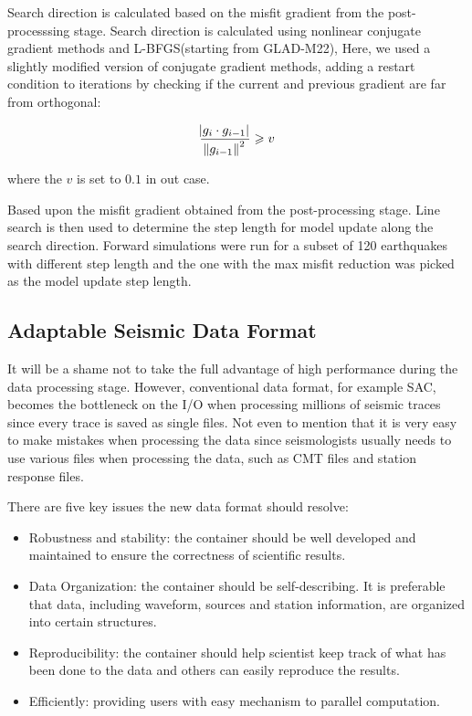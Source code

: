 \documentclass[extra,mreferee]{gji}
\begin{document}
Search direction is calculated based on the misfit gradient from the
post-processsing stage. Search direction is calculated using nonlinear conjugate
gradient methods\citep{tape2007finite} and L-BFGS(starting from GLAD-M22),
Here, we used a slightly modified version of conjugate gradient methods,
adding a restart condition\citep{wright1999numerical} to iterations by checking
if the current and previous gradient are far from orthogonal:

\begin{equation}
  \frac { \abs{g_i \cdot g_{i-1}} }  {\norm{g_{i-1}}^2} \geqslant v
\end{equation}

where the $v$ is set to $0.1$ in out case.

Based upon the misfit gradient obtained from the post-processing stage.
Line search is then used to determine the step length for model update
along the search direction. Forward simulations were run for a subset
of 120 earthquakes with different step length and the one with
the max misfit reduction was picked as the model update step length.

\subsection{Adaptable Seismic Data Format}

It will be a shame not to take the full advantage of high performance during the data processing stage. However, conventional data format, for example SAC, becomes the bottleneck on the I/O when processing millions of seismic traces since every trace is saved as single files. Not even to mention that it is very easy to make mistakes when processing the data since seismologists usually needs to use various files when processing the data, such as CMT files and station response files.

There are five key issues the new data format should resolve:
\begin{itemize}
    \item Robustness and stability: the container should be well developed and maintained to ensure the correctness of scientific results.
    \item Data Organization: the container should be self-describing. It is preferable that data, including waveform, sources and station information, are organized into certain structures.
    \item Reproducibility: the container should help scientist keep track of what has been done to the data and others can easily reproduce the results.
    \item Efficiently: providing users with easy mechanism to parallel computation.

\end{itemize}
\end{document}
